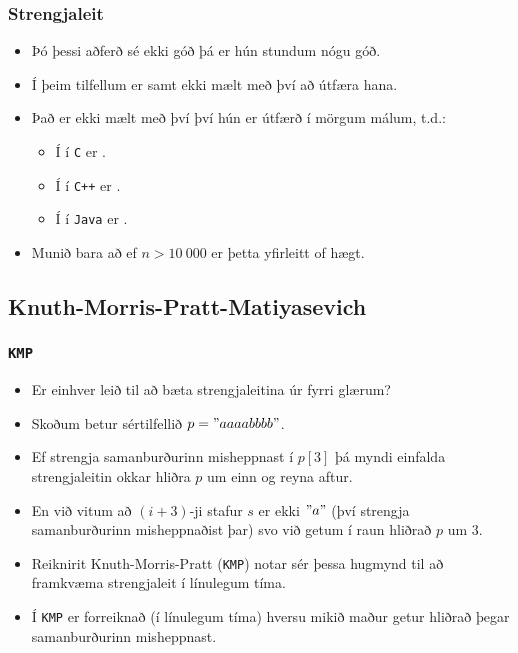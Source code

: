 \documentclass{beamer}
\begin{document}
\begin{frame}
	\frametitle{Strengjaleit}
	\begin{itemize}
		\item<1-> Þó þessi aðferð sé ekki góð þá er hún stundum nógu góð.
		\item<2-> Í þeim tilfellum er samt ekki mælt með því að útfæra hana.
		\item<3-> Það er ekki mælt með því því hún er útfærð í mörgum málum, t.d.:
			\begin{itemize}
				\item<4-> Í  í \texttt{C} er .
				\item<5-> Í  í \texttt{C++} er .
				\item<6-> Í  í \texttt{Java} er .
			\end{itemize}
		\item<7-> Munið bara að ef $n > 10\ 000$ er þetta yfirleitt of hægt.
	\end{itemize}
\end{frame}

\subsection{Knuth-Morris-Pratt-Matiyasevich}

\begin{frame}
	\frametitle{\texttt{KMP}}
	\begin{itemize}
		\item<1-> Er einhver leið til að bæta strengjaleitina úr fyrri glærum?
		\item<2-> Skoðum betur sértilfellið $p = "aaaabbbb"$.
		\item<3-> Ef strengja samanburðurinn misheppnast í $p[3]$ þá myndi einfalda strengjaleitin
			okkar hliðra $p$ um einn og reyna aftur.
		\item<4-> En við vitum að $(i + 3)$-ji stafur $s$ er ekki $"a"$ (því strengja samanburðurinn
			misheppnaðist þar) svo við getum í raun hliðrað $p$ um $3$.
		\item<5-> Reiknirit Knuth-Morris-Pratt (\texttt{KMP}) notar sér þessa hugmynd til að framkvæma strengjaleit
			í línulegum tíma.
		\item<6-> Í \texttt{KMP} er forreiknað (í línulegum tíma) hversu mikið maður getur hliðrað 
			þegar samanburðurinn misheppnast.
	\end{itemize}
\end{frame}
\end{document}
